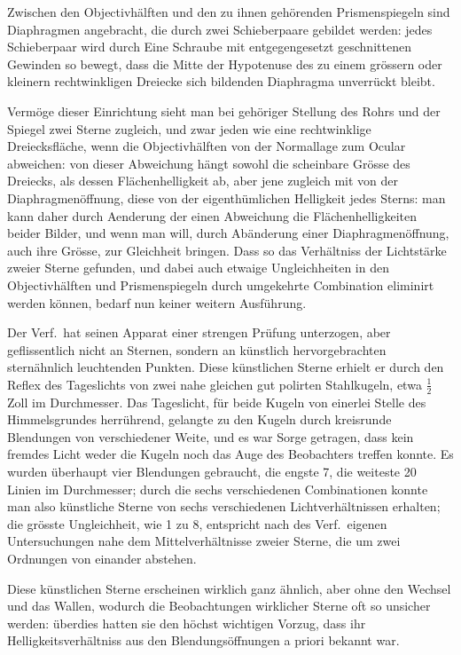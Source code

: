 \documentclass[12pt,a4paper]{article}
\begin{document}
Zwischen den Objectivh\"alften und den zu ihnen geh\"orenden Prismenspiegeln sind Diaphragmen angebracht, die durch zwei Schieberpaare gebildet werden: jedes Schieberpaar wird durch Eine Schraube mit entgegengesetzt geschnittenen Gewinden so bewegt, dass die Mitte der Hypotenuse des zu einem gr\"ossern oder kleinern rechtwinkligen Dreiecke sich bildenden Diaphragma unverr\"uckt bleibt.

Verm\"oge dieser Einrichtung sieht man bei geh\"origer Stellung des Rohrs und der Spiegel zwei Sterne zugleich, und zwar jeden wie eine rechtwinklige Dreiecksfl\"ache, wenn die Objectivh\"alften von der Normallage zum Ocular abweichen: von dieser Abweichung h\"angt sowohl die scheinbare Gr\"osse des Dreiecks, als dessen Fl\"achenhelligkeit ab, aber jene zugleich mit von der Diaphragmen\"offnung, diese von der eigenth\"umlichen Helligkeit jedes Sterns: man kann daher durch Aenderung der einen Abweichung die Fl\"achenhelligkeiten beider Bilder, und wenn man will, durch Ab\"anderung einer Diaphragmen\"offnung, auch ihre Gr\"osse, zur Gleichheit bringen. Dass so das Verh\"altniss der Lichtst\"arke zweier Sterne gefunden, und dabei auch etwaige Ungleichheiten in den Objectivh\"alften und Prismenspiegeln durch umgekehrte Combination eliminirt werden k\"onnen, bedarf nun keiner weitern Ausf\"uhrung.

Der Verf.\ hat seinen Apparat einer strengen Pr\"ufung unterzogen, aber geflissentlich nicht an Sternen, sondern an k\"unstlich hervorgebrachten stern\"ahnlich leuchtenden Punkten. Diese k\"unstlichen Sterne erhielt er durch den Reflex des Tageslichts von zwei nahe gleichen gut polirten Stahlkugeln, etwa $\frac{1}{2}$ Zoll im Durchmesser. Das Tageslicht, f\"ur beide Kugeln von einerlei Stelle des Himmelsgrundes herr\"uhrend, gelangte zu den Kugeln durch kreisrunde Blendungen von verschiedener Weite, und es war Sorge getragen, dass kein fremdes Licht weder die Kugeln noch das Auge des Beobachters treffen konnte. Es wurden \"uberhaupt vier Blendungen gebraucht, die engste 7, die weiteste 20 Linien im Durchmesser; durch die sechs verschiedenen Combinationen konnte man also k\"unstliche Sterne von sechs verschiedenen Lichtverh\"altnissen erhalten; die gr\"osste Ungleichheit, wie 1 zu 8, entspricht nach des Verf.\ eigenen Untersuchungen nahe dem Mittelverh\"altnisse zweier Sterne, die um zwei Ordnungen von einander abstehen.

Diese k\"unstlichen Sterne erscheinen wirklich ganz \"ahnlich, aber ohne den Wechsel und das Wallen, wodurch die Beobachtungen wirklicher Sterne oft so unsicher werden: \"uberdies hatten sie den h\"ochst wichtigen Vorzug, dass ihr Helligkeitsverh\"altniss aus den Blendungs\"offnungen a priori bekannt war.
\end{document}
